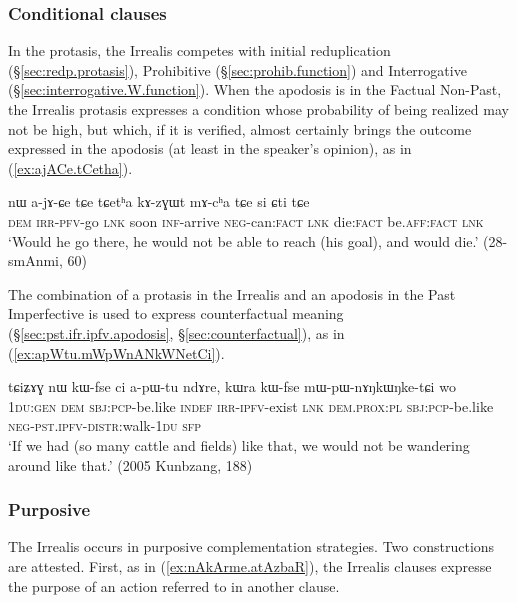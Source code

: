 \subsubsection{Conditional clauses} \label{sec:irrealis.conditional}
In the protasis, the Irrealis competes with initial reduplication (§\ref{sec:redp.protasis}), Prohibitive (§\ref{sec:prohib.function}) and Interrogative (§\ref{sec:interrogative.W.function}). When the apodosis is in the Factual Non-Past, the Irrealis protasis expresses a condition whose probability of being realized may not be high, but which, if it is verified, almost certainly brings the outcome expressed in the apodosis (at least in the speaker's opinion), as in (\ref{ex:ajACe.tCetha}).

\begin{exe}
\ex \label{ex:ajACe.tCetha}
\gll nɯ a-jɤ-ɕe tɕe tɕetʰa kɤ-zɣɯt mɤ-cʰa tɕe si ɕti tɕe \\
\textsc{dem} \textsc{irr}-\textsc{pfv}-go \textsc{lnk} soon \textsc{inf}-arrive \textsc{neg}-can:\textsc{fact} \textsc{lnk} die:\textsc{fact} be.\textsc{aff}:\textsc{fact} \textsc{lnk} \\
\glt `Would he go there, he would not be able to reach (his goal), and would die.' (28-smAnmi, 60)
\end{exe}

The combination of a protasis in the Irrealis and an apodosis in the Past Imperfective is used to express counterfactual meaning (§\ref{sec:pst.ifr.ipfv.apodosis}, §\ref{sec:counterfactual}), as in (\ref{ex:apWtu.mWpWnANkWNetCi}).

\begin{exe}
\ex \label{ex:apWtu.mWpWnANkWNetCi}
\gll tɕiʑɤɣ nɯ kɯ-fse ci a-pɯ-tu ndɤre, kɯra kɯ-fse mɯ-pɯ-nɤŋkɯŋke-tɕi wo \\
\textsc{1du}:\textsc{gen} \textsc{dem} \textsc{sbj}:\textsc{pcp}-be.like \textsc{indef} \textsc{irr}-\textsc{ipfv}-exist \textsc{lnk} \textsc{dem}.\textsc{prox}:\textsc{pl} \textsc{sbj}:\textsc{pcp}-be.like \textsc{neg}-\textsc{pst}.\textsc{ipfv}-\textsc{distr}:walk-\textsc{1du} \textsc{sfp} \\
\glt `If we had (so many cattle and fields) like that, we would not be wandering around like that.' (2005 Kunbzang, 188)
\end{exe}


\subsubsection{Purposive} \label{sec:irrealis.purposive}
The Irrealis occurs in purposive complementation strategies. Two constructions are attested. First, as in (\ref{ex:nAkArme.atAzbaR}), the Irrealis clauses expresse the purpose of an action referred to in another clause.

